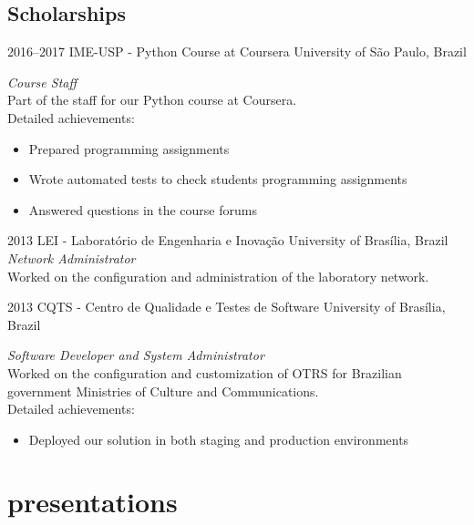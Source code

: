 \documentclass[]{friggeri-cv} %
\begin{document}
\subsection{Scholarships}

\begin{entrylist}

\entry
{2016--2017}
{IME-USP - Python Course at Coursera}
{University of São Paulo, Brazil}
{\emph{Course Staff} \\
Part of the staff for our Python course at Coursera. \\
Detailed achievements:
\begin{itemize}
  \item Prepared programming assignments
  \item Wrote automated tests to check students programming assignments
  \item Answered questions in the course forums
\end{itemize}}

\entry
{2013}
{LEI - Laboratório de Engenharia e Inovação}
{University of Brasília, Brazil}
{\emph{Network Administrator} \\
  Worked on the configuration and administration of the laboratory network. \\
}


\entry
{2013}
{CQTS - Centro de Qualidade e Testes de Software}
{University of Brasília, Brazil}
{\emph{Software Developer and System Administrator} \\
  Worked on the configuration and customization of OTRS for Brazilian
  government Ministries of Culture and Communications. \\
Detailed achievements:
\begin{itemize}
  \item Deployed our solution in both staging and production environments
\end{itemize}}

\end{entrylist}

\section{presentations}
\end{document}
